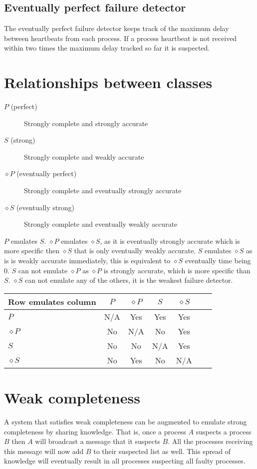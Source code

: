 \documentclass[11pt]{amsart}
\begin{document}
\subsection{Eventually perfect failure detector}

The eventually perfect failure detector keeps track of the maximum delay
between heartbeats from each process. If a process heartbeat is not received
within two times the maximum delay tracked so far it is suspected.

\section{Relationships between classes}

\begin{description}
	\item[$P$ (perfect)] Strongly complete and strongly accurate
	\item[$S$ (strong)] Strongly complete and weakly accurate
	\item[$\diamond P$ (eventually perfect)] Strongly complete and eventually strongly accurate
	\item[$\diamond S$ (eventually strong)] Strongly complete and eventually weakly accurate
\end{description}

$P$ emulates $S$. 
$\diamond P$ emulates $\diamond S$, as it is eventually strongly accurate which
is more specific then $\diamond S$ that is only eventually weakly accurate.
$S$ emulates $\diamond S$ as is is weakly accurate immediately, this is equivalent to $\diamond S$ eventually time being 0.
$S$ can not emulate $\diamond P$ as $\diamond P$ is strongly accurate, which is more specific than $S$.
$\diamond S$ can not emulate any of the others, it is the weakest failure detector.

\begin{tabular}{|l|c|c|c|c|c|c|}
\hline
Row emulates column  & $P$ & $\diamond P$ & $S$ & $\diamond S$ \\ \hline
$P$                  & N/A & Yes          & Yes & Yes          \\ \hline
$\diamond P$         & No  & N/A          & No  & Yes          \\ \hline
$S$                  & No  & No           & N/A & Yes          \\ \hline
$\diamond S$         & No  & Yes          & No  & N/A          \\ \hline
\end{tabular}


\section{Weak completeness}

A system that satisfies weak completeness can be augmented to emulate strong
completeness by sharing knowledge. That is, once a process $A$ suspects a
process $B$ then $A$ will broadcast a message that it suspects $B$. All the
processes receiving this message will now add $B$ to their suspected list as
well. This spread of knowledge will eventually result in all processes
suspecting all faulty processes.
\end{document}
